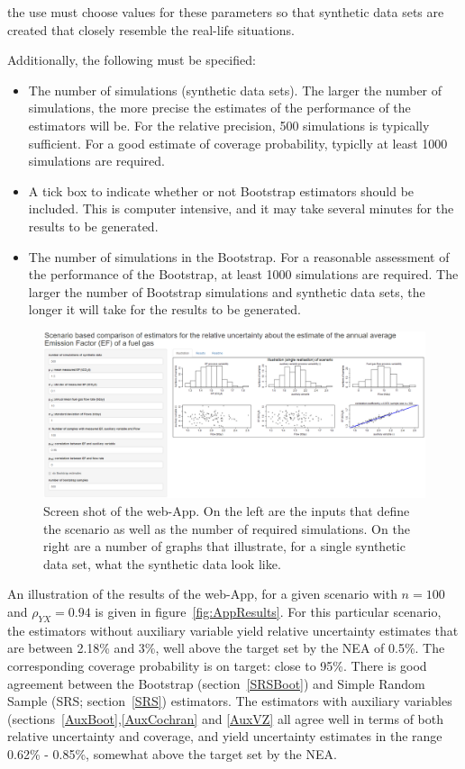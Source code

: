 the use must choose values for these parameters so that synthetic data sets are created that closely resemble the real-life situations.

Additionally, the following must be specified:
\begin{itemize}
	\item The number of simulations (synthetic data sets). The larger the number of simulations, the more precise the estimates of the performance of the estimators will be. For the relative precision, 500 simulations is typically sufficient. For a good estimate of coverage probability, typiclly at least 1000 simulations are required.
	\item A tick box to indicate whether or not Bootstrap estimators should be included. This is computer intensive, and it may take several minutes for the results to be generated.
	\item The number of simulations in the Bootstrap. For a reasonable assessment of the performance of the Bootstrap, at least 1000 simulations are required. The larger the number of Bootstrap simulations and synthetic data sets, the longer it will take for the results to be generated.
\end{itemize}

\begin{figure}[h]
	\centering
	\includegraphics[width=\textwidth]{graphs/AppCapture.PNG}
	\caption{Screen shot of the web-App. On the left are the inputs that define the scenario as well as the number of required simulations. On the right are a number of graphs that illustrate, for a single synthetic data set, what the synthetic data look like. }
	\label{fig:App}
\end{figure}

An illustration of the results of the web-App, for a given scenario with $n=100$ and $\rho_{YX}=0.94$ is given in figure~\ref{fig:AppResults}. For this particular scenario, the estimators without auxiliary variable yield relative uncertainty estimates that are between 2.18\% and 3\%, well above the target set by the NEA of 0.5\%. The corresponding coverage probability is on target: close to 95\%. There is good agreement between the  Bootstrap (section~\ref{SRSBoot}) and Simple Random Sample (SRS; section~\ref{SRS}) estimators. The estimators with auxiliary variables (sections~\ref{AuxBoot},\ref{AuxCochran} and \ref{AuxVZ} all agree well in terms of both relative uncertainty and coverage, and yield uncertainty estimates in the range 0.62\% - 0.85\%, somewhat above the target set by the NEA. 

